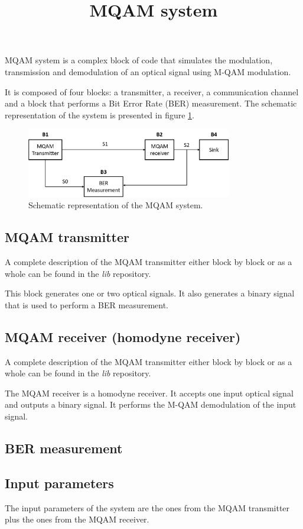 \documentclass[a4paper]{article}
\title{MQAM system}
\begin{document}
	
	\maketitle
	
MQAM system is a complex block of code that simulates the modulation, transmission and demodulation of an optical signal using M-QAM modulation.
	
It is composed of four blocks: a transmitter, a receiver, a communication channel and a block that performs a Bit Error Rate (BER) measurement. The schematic representation of the system is presented in figure \ref{MQAM_system_block_diagram}.

\begin{figure}
	\centering
	\includegraphics[width=0.8\textwidth]{MQAM_system_block_diagram}
	\caption{Schematic representation of the MQAM system.}\label{MQAM_system_block_diagram}
\end{figure}

\subsection*{MQAM transmitter}

A complete description of the MQAM transmitter either block by block or as a whole can be found in the \textit{lib} repository. 

This block generates one or two optical signals. It also generates a binary signal that is used to perform a BER measurement.

\subsection*{MQAM receiver (homodyne receiver)}

A complete description of the MQAM transmitter either block by block or as a whole can be found in the \textit{lib} repository.

The MQAM receiver is a homodyne receiver. It accepts one input optical signal and outputs a binary signal. It performs the M-QAM demodulation of the input signal.

\subsection*{BER measurement}

\subsection*{Input parameters}

The input parameters of the system are the ones from the MQAM transmitter plus the ones from the MQAM receiver.
\end{document}
